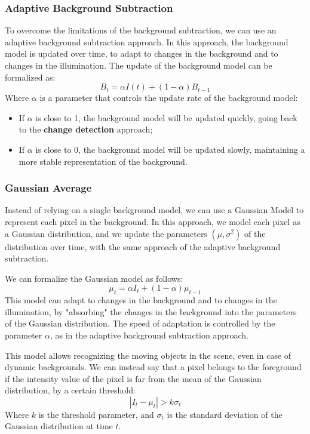 \subsubsection{Adaptive Background Subtraction}
To overcome the limitations of the background subtraction, we can use an adaptive background subtraction approach.
In this approach, the background model is updated over time, to adapt to changes in the background and to changes in the illumination.
The update of the background model can be formalized as:
\begin{equation}
    B_t = \alpha I(t) + (1 - \alpha) B_{t-1}
\end{equation}
Where $\alpha$ is a parameter that controls the update rate of the background model:
\begin{itemize}
    \item If $\alpha$ is close to 1, the background model will be updated quickly, going back to the \textbf{change detection} approach;
    \item If $\alpha$ is close to 0, the background model will be updated slowly, maintaining a more stable representation of the background.
\end{itemize}

\subsubsection{Gaussian Average}
Instead of relying on a single background model, we can use a Gaussian Model to represent each pixel in the background.
In this approach, we model each pixel as a Gaussian distribution, and we update the parameters $(\mu, \sigma^2)$ of the distribution over time,
with the same approach of the adaptive background subtraction. 

We can formalize the Gaussian model as follows:
\begin{equation}
    \label{eq:gaussian_update}
    \mu_t = \alpha I_t + (1 - \alpha) \mu_{t-1}
\end{equation}
This model can adapt to changes in the background and to changes in the illumination,
by "absorbing" the changes in the background into the parameters of the Gaussian distribution.
The speed of adaptation is controlled by the parameter $\alpha$, as in the adaptive background subtraction approach.

This model allows recognizing the moving objects in the scene, even in case of dynamic backgrounds.
We can instead say that a pixel belongs to the foreground if the intensity value of the pixel is far from the mean of the Gaussian distribution, by a certain threshold:
\begin{equation}
    |I_t - \mu_t| > k \sigma_t
\end{equation}
Where $k$ is the threshold parameter, and $\sigma_t$ is the standard deviation of the Gaussian distribution at time $t$.

